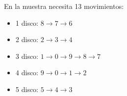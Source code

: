 \begin{example}
\end{example}

\explanationText

En la muestra necesita 13 movimientos:
\begin{itemize}
    \item 1 disco: $8 \longrightarrow 7 \longrightarrow 6$
    \item 2 disco: $2 \longrightarrow 3 \longrightarrow 4$
    \item 3 disco: $1 \longrightarrow 0 \longrightarrow 9 \longrightarrow 8 \longrightarrow 7$
    \item 4 disco: $9 \longrightarrow 0 \longrightarrow 1 \longrightarrow 2$
    \item 5 disco: $5 \longrightarrow 4 \longrightarrow 3$
\end{itemize}
